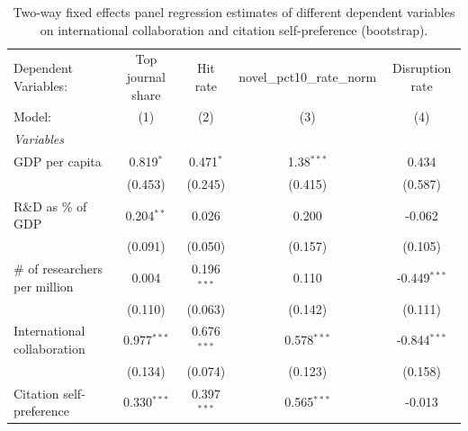 
\begin{table}[H]
   \caption{\label{tab:quality_polity2} Two-way fixed effects panel regression estimates of different dependent variables on international
   collaboration and citation self-preference (bootstrap).}
   \centering
   \scriptsize
   \renewcommand*{\arraystretch}{0.7}
   \begin{tabular}{lcccc}
      \tabularnewline \midrule \midrule
      Dependent Variables:                                           & Top journal share & Hit rate      & novel\_pct10\_rate\_norm    & Disruption rate\\  
      Model:                                                         & (1)               & (2)           & (3)                         & (4)\\  
      \midrule
      \emph{Variables}\\
      GDP per capita                                                 & 0.819$^{*}$       & 0.471$^{*}$   & 1.38$^{***}$                & 0.434\\   
                                                                     & (0.453)           & (0.245)       & (0.415)                     & (0.587)\\   
      R\&D as \% of GDP                                              & 0.204$^{**}$      & 0.026         & 0.200                       & -0.062\\   
                                                                     & (0.091)           & (0.050)       & (0.157)                     & (0.105)\\   
      \# of researchers per million                                  & 0.004             & 0.196$^{***}$ & 0.110                       & -0.449$^{***}$\\   
                                                                     & (0.110)           & (0.063)       & (0.142)                     & (0.111)\\   
      International collaboration                                    & 0.977$^{***}$     & 0.676$^{***}$ & 0.578$^{***}$               & -0.844$^{***}$\\   
                                                                     & (0.134)           & (0.074)       & (0.123)                     & (0.158)\\   
      Citation self-preference                                       & 0.330$^{***}$     & 0.397$^{***}$ & 0.565$^{***}$               & -0.013\\   

\end{tabular}
\end{table}
